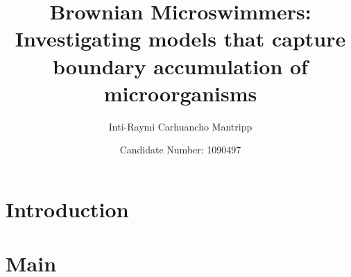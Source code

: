 \documentclass[12pt,a4paper]{article}
\title{Brownian Microswimmers: Investigating models that capture boundary accumulation of microorganisms}
\author{Inti-Raymi Carhuancho Mantripp}
\date{Candidate Number: 1090497}
\begin{document}
\maketitle

\thispagestyle{empty}

\newpage
\setcounter{page}{1}


\section{Introduction}\label{sec: intro}

\section{Main}\label{sec:2_models_and_preamble}

% 
% 
\printbibliography
\end{document}
